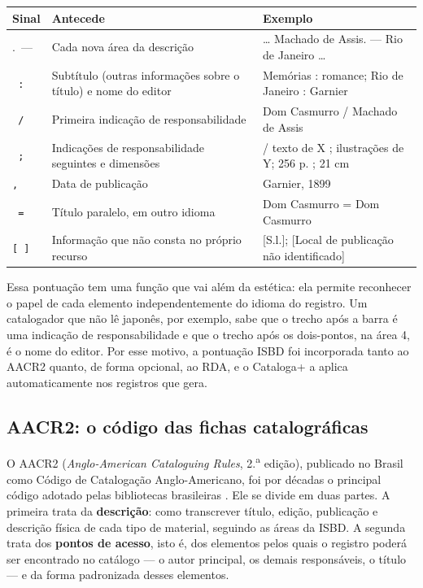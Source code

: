 \begin{quadro}[htb]
    \centering
    \caption{Principais sinais de pontuação prescritos pela ISBD}
    \label{qua:isbd-pontuacao}
    \footnotesize
    \begin{tabular}{|p{}|p{}|p{}|}
        \hline
        \textbf{Sinal} & \textbf{Antecede} & \textbf{Exemplo} \\ \hline
        .~---~ & Cada nova área da descrição & \ldots{} Machado de Assis. --- Rio de Janeiro \ldots \\ \hline
        \texttt{~:~} & Subtítulo (outras informações sobre o título) e nome do editor & Memórias : romance; Rio de Janeiro : Garnier \\ \hline
        \texttt{~/~} & Primeira indicação de responsabilidade & Dom Casmurro / Machado de Assis \\ \hline
        \texttt{~;~} & Indicações de responsabilidade seguintes e dimensões & / texto de X ; ilustrações de Y; 256 p. ; 21 cm \\ \hline
        \texttt{,~} & Data de publicação & Garnier, 1899 \\ \hline
        \texttt{~=~} & Título paralelo, em outro idioma & Dom Casmurro = Dom Casmurro \\ \hline
        \texttt{[~]} & Informação que não consta no próprio recurso & [S.l.]; [Local de publicação não identificado] \\ \hline
    \end{tabular}
\end{quadro}

Essa pontuação tem uma função que vai além da estética: ela permite reconhecer o papel de cada elemento independentemente do idioma do registro. Um catalogador que não lê japonês, por exemplo, sabe que o trecho após a barra é uma indicação de responsabilidade e que o trecho após os dois-pontos, na área 4, é o nome do editor. Por esse motivo, a pontuação ISBD foi incorporada tanto ao AACR2 quanto, de forma opcional, ao RDA, e o Cataloga+ a aplica automaticamente nos registros que gera.

\subsection{AACR2: o código das fichas catalográficas}
\label{subsec:aacr2}

O AACR2 (\textit{Anglo-American Cataloguing Rules}, 2.\textsuperscript{a} edição), publicado no Brasil como Código de Catalogação Anglo-Americano, foi por décadas o principal código adotado pelas bibliotecas brasileiras \cite{jsc2005}. Ele se divide em duas partes. A primeira trata da \textbf{descrição}: como transcrever título, edição, publicação e descrição física de cada tipo de material, seguindo as áreas da ISBD. A segunda trata dos \textbf{pontos de acesso}, isto é, dos elementos pelos quais o registro poderá ser encontrado no catálogo --- o autor principal, os demais responsáveis, o título --- e da forma padronizada desses elementos.

